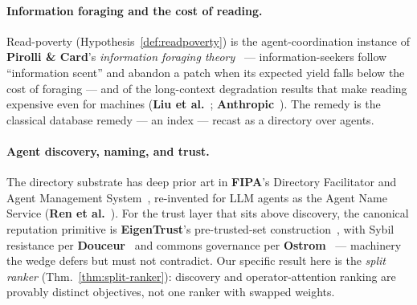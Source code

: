 \documentclass[11pt,a4paper]{article}
\theoremstyle{definition}
\theoremstyle{plain}
\begin{document}
\paragraph{Information foraging and the cost of reading.}
Read-poverty (Hypothesis~\ref{def:readpoverty}) is the agent-coordination instance of
\textbf{Pirolli \& Card}'s \emph{information foraging theory}~ ---
information-seekers follow ``information scent'' and abandon a patch when its expected
yield falls below the cost of foraging --- and of the long-context degradation
results that make reading expensive even for machines (\textbf{Liu et
al.}~; \textbf{Anthropic}~). The remedy is the
classical database remedy --- an index --- recast as a directory over agents.

\paragraph{Agent discovery, naming, and trust.}
The directory substrate has deep prior art in \textbf{FIPA}'s Directory Facilitator
and Agent Management System~, re-invented for LLM agents as the Agent
Name Service (\textbf{Ren et al.}~). For the trust layer that sits above
discovery, the canonical reputation primitive is \textbf{EigenTrust}'s pre-trusted-set
construction~, with Sybil resistance per
\textbf{Douceur}~ and commons governance per
\textbf{Ostrom}~ --- machinery the wedge defers but must not
contradict. Our specific result here is the \emph{split ranker}
(Thm.~\ref{thm:split-ranker}): discovery and operator-attention ranking are provably
distinct objectives, not one ranker with swapped weights.
\end{document}
